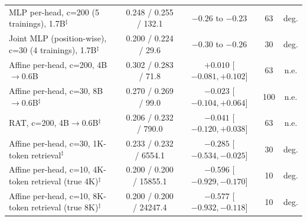 \documentclass[10pt]{article}
\begin{document}
\begin{table}[t]
\begin{tabular}{lcccc}
MLP per-head, c=200 (5 trainings), 1.7B$^\ddagger$ & 0.248 / 0.255 / 132.1 & $-0.26$ to $-0.23$ & 63 & deg. \\
Joint MLP (position-wise), c=30 (4 trainings), 1.7B$^\ddagger$ & 0.200 / 0.224 / 29.6 & $-0.30$ to $-0.26$ & 30 & deg. \\
Affine per-head, c=200, 4B$\to$0.6B & 0.302 / 0.283 / 71.8 & $+0.010$ [$-0.081, +0.102$] & 63 & n.e. \\
Affine per-head, c=30, 8B$\to$0.6B$^\ddagger$ & 0.270 / 0.269 / 99.0 & $-0.023$ [$-0.104, +0.064$] & 100 & n.e. \\
RAT, c=200, 4B$\to$0.6B$^\ddagger$ & 0.206 / 0.232 / 790.0 & $-0.041$ [$-0.120, +0.038$] & 63 & n.e. \\
Affine per-head, c=30, 1K-token retrieval$^\ddagger$ & 0.233 / 0.232 / 6554.1 & $-0.285$ [$-0.534, -0.025$] & 30 & deg. \\
Affine per-head, c=10, 4K-token retrieval (true 4K)$^\ddagger$ & 0.200 / 0.200 / 15855.1 & $-0.596$ [$-0.929, -0.170$] & 10 & deg. \\
Affine per-head, c=10, 8K-token retrieval (true 8K)$^\ddagger$ & 0.200 / 0.200 / 24247.4 & $-0.577$ [$-0.932, -0.118$] & 10 & deg. \\
\bottomrule
\end{tabular}
\end{table}
\end{document}
